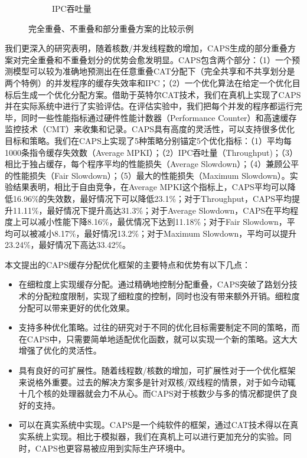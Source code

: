 \begin{figure}[htbp]
\begin{subfigure}[b]{0.4\linewidth}
        \caption{IPC吞吐量}
    \end{subfigure}
    \caption{完全重叠、不重叠和部分重叠方案的比较示例}
    \label{fig:illustration}
\end{figure}

我们更深入的研究表明，随着核数/并发线程数的增加，CAPS生成的部分重叠方案对完全重叠和不重叠划分的优势会愈发明显。CAPS包含两个部分：（1）一个预测模型可以较为准确地预测出在任意重叠CAT分配下（完全共享和不共享划分是两个特例）的并发程序的缓存失效率和IPC；（2）一个优化算法在给定一个优化目标后生成一个优化分配方案。借助于英特尔CAT技术，我们在真机上实现了CAPS并在实际系统中进行了实验评估。在评估实验中，我们把每个并发的程序都运行完毕，同时一些性能指标通过硬件性能计数器（Performance Counter）和高速缓存监控技术（CMT）来收集和记录。CAPS具有高度的灵活性，可以支持很多优化目标和策略。我们在CAPS上实现了5种策略分别锚定5个优化指标：（1）平均每1000条指令缓存失效数（Average MPKI）；（2）IPC吞吐量（Throughput)；（3）相比于独占缓存，每个程序平均的性能损失（Average Slowdown）；（4）兼顾公平的性能损失（Fair Slowdown）；（5）最大的性能损失（Maximum Slowdown）。实验结果表明，相比于自由竞争，在Average MPKI这个指标上，CAPS平均可以降低16.96\%的失效数，最好情况下可以降低23.1\%；对于Throughput，CAPS平均提升11.11\%，最好情况下提升高达31.3\%；对于Average Slowdown，CAPS在平均程度上可以减小性能下降8.16\%，最优情况下达到11.18\%；对于Fair Slowdown，平均可以被减小8.17\%，最好情况13.2\%；对于Maximum Slowdown，平均可以提升23.24\%，最好情况下高达33.42\%。

本文提出的CAPS缓存分配优化框架的主要特点和优势有以下几点：

\begin{itemize}
    \item 在细粒度上实现缓存分配。通过精确地控制分配重叠，CAPS突破了路划分技术的分配粒度限制，实现了细粒度的控制，同时也没有带来额外开销。细粒度分配可以带来更好的优化效果。
    \item 支持多种优化策略。过往的研究对于不同的优化目标需要制定不同的策略，而在CAPS中，只需要简单地适配优化函数，就可以实现一个新的策略。这大大增强了优化的灵活性。
    \item 具有良好的可扩展性。随着线程数/核数的增加，可扩展性对于一个优化框架来说格外重要。过去的解决方案多是针对双核/双线程的情景，对于如今动辄十几个核的处理器就会力不从心。而CAPS对于核数少与多的情况都提供了良好的支持。
    \item 可以在真实系统中实现。CAPS是一个纯软件的框架，通过CAT技术得以在真实系统上实现。相比于模拟器，我们在真机上可以进行更加充分的实验。同时，CAPS也更容易被应用到实际生产环境中。
\end{itemize}

